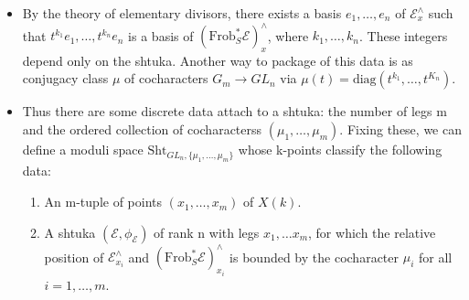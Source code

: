 \documentclass[aspectratio=1610]{ctexbeamer}
\def  \Frob     {\mathrm{Frob}}
\def  \ce       {\mathcal{E}}
\begin{document}
\begin{frame}

\begin{itemize}
\item By the theory of elementary divisors, there exists a basis $e_1, \dots, e_n$ of $\ce^{\wedge}_x$ such that $t^{k_1}e_1, \dots, t^{k_n}e_n$ is a basis of $(\Frob_S^* \ce)^{\wedge}_x$, where $k_1, \dots, k_n$. These integers depend only on the shtuka. Another way to package of this data is as conjugacy class $\mu$ of cocharacters $G_m \to GL_n$ via $\mu(t)= \mathrm{diag}(t^{k_1},\dots, t^{K_n})$.


\item Thus there are some discrete data attach to a shtuka: the number of legs m and the ordered collection of cocharacterss $(\mu_1, \dots, \mu_m)$. Fixing these, we can define a moduli space $\mathrm{Sht}_{GL_n, \{\mu_1, \dots, \mu_m\}}$ whose k-points classify the following data:

\begin{enumerate}
	\item An m-tuple of points $(x_1, \dots, x_m)$ of $X(k)$.
	\item A shtuka $(\ce, \phi_{\ce})$  of rank n with legs $x_1, \dots x_m$, for which the relative position of $\ce^{\wedge}_{x_i}$ and $(\Frob_S^* \ce)^{\wedge}_{x_i}$ is bounded by the cocharacter $\mu_i$ for all $i=1, \dots, m$.
\end{enumerate}

\end{itemize}

\end{frame}
\end{document}
